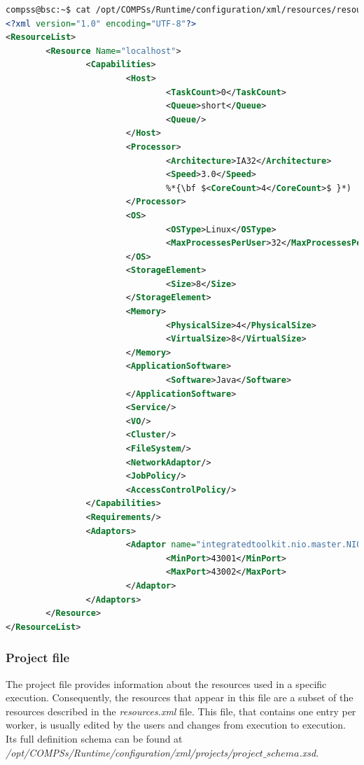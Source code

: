 \begin{lstlisting}[language=xml]
compss@bsc:~$ cat /opt/COMPSs/Runtime/configuration/xml/resources/resources.xml
<?xml version="1.0" encoding="UTF-8"?>
<ResourceList>
        <Resource Name="localhost">
                <Capabilities>
                        <Host>
                                <TaskCount>0</TaskCount>
                                <Queue>short</Queue>
                                <Queue/>
                        </Host>
                        <Processor>
                                <Architecture>IA32</Architecture>
                                <Speed>3.0</Speed>
                                %*{\bf $<CoreCount>4</CoreCount>$ }*)
                        </Processor>
                        <OS>
                                <OSType>Linux</OSType>
                                <MaxProcessesPerUser>32</MaxProcessesPerUser>
                        </OS>
                        <StorageElement>
                                <Size>8</Size>
                        </StorageElement>
                        <Memory>
                                <PhysicalSize>4</PhysicalSize>
                                <VirtualSize>8</VirtualSize>
                        </Memory>
                        <ApplicationSoftware>
                                <Software>Java</Software>
                        </ApplicationSoftware>
                        <Service/>
                        <VO/>
                        <Cluster/>
                        <FileSystem/>
                        <NetworkAdaptor/>
                        <JobPolicy/>
                        <AccessControlPolicy/>
                </Capabilities>
                <Requirements/>
                <Adaptors>
                        <Adaptor name="integratedtoolkit.nio.master.NIOAdaptor">
                                <MinPort>43001</MinPort>
                                <MaxPort>43002</MaxPort>
                        </Adaptor>
                </Adaptors>
        </Resource>
</ResourceList>
\end{lstlisting}


\subsubsection{Project file}
The project file provides information about the resources used in a specific execution. Consequently, the resources that appear in this file are a subset of the 
resources described in the \textit{resources.xml} file. This file, that contains one entry per worker, is usually edited by the users and changes from execution to execution. Its full definition schema can be found at\\ 
\emph{/opt/COMPSs/Runtime/configuration/xml/projects/$project\_schema$.xsd}.

